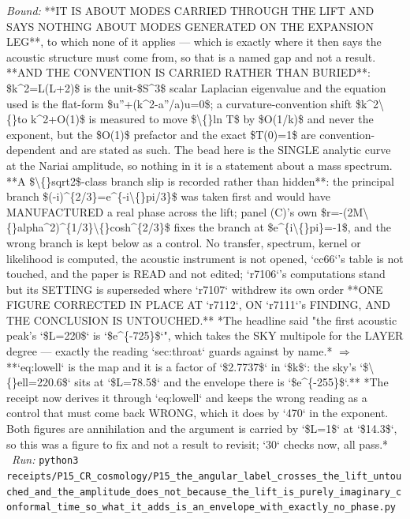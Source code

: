 \begin{description}
 \emph{Bound:}  **IT IS ABOUT MODES CARRIED THROUGH THE LIFT AND SAYS NOTHING ABOUT MODES GENERATED ON THE EXPANSION LEG**, to which none of it applies --- which is exactly where it then says the acoustic structure must come from, so that is a named gap and not a result.  **AND THE CONVENTION IS CARRIED RATHER THAN BURIED**: \$k\textasciicircum{}2=L(L+2)\$ is the unit-\$S\textasciicircum{}3\$ scalar Laplacian eigenvalue and the equation used is the flat-form \$u''+(k\textasciicircum{}2-a''/a)u=0\$; a curvature-convention shift \$k\textasciicircum{}2\textbackslash\{\}to k\textasciicircum{}2+O(1)\$ is measured to move \$\textbackslash\{\}ln T\$ by \$O(1/k)\$ and never the exponent, but the \$O(1)\$ prefactor and the exact \$T(0)=1\$ are convention-dependent and are stated as such.  The bead here is the SINGLE analytic curve at the Nariai amplitude, so nothing in it is a statement about a mass spectrum.  **A \$\textbackslash\{\}sqrt2\$-class branch slip is recorded rather than hidden**: the principal branch \$(-i)\textasciicircum{}\{2/3\}=e\textasciicircum{}\{-i\textbackslash\{\}pi/3\}\$ was taken first and would have MANUFACTURED a real phase across the lift; panel (C)'s own \$r=-(2M\textbackslash\{\}alpha\textasciicircum{}2)\textasciicircum{}\{1/3\}\textbackslash\{\}cosh\textasciicircum{}\{2/3\}\$ fixes the branch at \$e\textasciicircum{}\{i\textbackslash\{\}pi\}=-1\$, and the wrong branch is kept below as a control.  No transfer, spectrum, kernel or likelihood is computed, the acoustic instrument is not opened, `cc66`'s table is not touched, and the paper is READ and not edited; `r7106`'s computations stand but its SETTING is superseded where `r7107` withdrew its own order  **ONE FIGURE CORRECTED IN PLACE AT `r7112`, ON `r7111`'s FINDING, AND THE CONCLUSION IS UNTOUCHED.** *The headline said "the first acoustic peak's `\$L=220\$` is `\$e\textasciicircum{}\{-725\}\$`", which takes the SKY multipole for the LAYER degree --- exactly the reading `sec:throat` guards against by name.* \ensuremath{\Rightarrow} **`eq:lowell` is the map and it is a factor of `\$2.7737\$` in `\$k\$`: the sky's `\$\textbackslash\{\}ell=220.6\$` sits at `\$L=78.5\$` and the envelope there is `\$e\textasciicircum{}\{-255\}\$`.** *The receipt now derives it through `eq:lowell` and keeps the wrong reading as a control that must come back WRONG, which it does by `470` in the exponent. Both figures are annihilation and the argument is carried by `\$L=1\$` at `\$14.3\$`, so this was a figure to fix and not a result to revisit; `30` checks now, all pass.*
\ \emph{Run:} \texttt{python3 receipts/P15\_CR\_cosmology/P15\_the\_angular\_label\_crosses\_the\_lift\_untouched\_and\_the\_amplitude\_does\_not\_because\_the\_lift\_is\_purely\_imaginary\_conformal\_time\_so\_what\_it\_adds\_is\_an\_envelope\_with\_exactly\_no\_phase.py}

\end{description}
